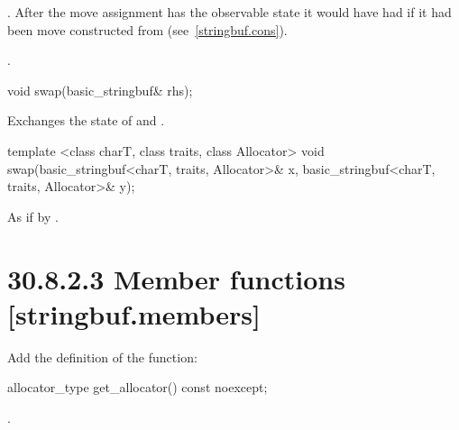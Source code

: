 \documentclass[ebook,11pt,article]{memoir}
\begin{document}
\begin{itemdescr}
\pnum
\effects {}. After the move assignment  has the observable state it would
have had if it had been move constructed from  (see~\ref{stringbuf.cons}).

\pnum
\returns {}.
\end{itemdescr}

%
\begin{itemdecl}
void swap(basic_stringbuf& rhs);
\end{itemdecl}

\begin{itemdescr}
\pnum
\effects Exchanges the state of 
and .
\end{itemdescr}

%
\begin{itemdecl}
template <class charT, class traits, class Allocator>
  void swap(basic_stringbuf<charT, traits, Allocator>& x,
            basic_stringbuf<charT, traits, Allocator>& y);
\end{itemdecl}

\begin{itemdescr}
\pnum
\effects As if by .
\end{itemdescr}




\section{30.8.2.3 Member functions [stringbuf.members]}
Add the definition of the  function:
\begin{addedblock}
\begin{itemdecl}
allocator_type get_allocator() const noexcept;
\end{itemdecl}

\begin{itemdescr}
\pnum
\returns {}.

\end{itemdescr}
\end{addedblock}
\end{document}
